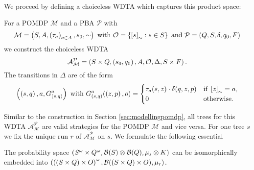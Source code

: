 We proceed by defining a choiceless \ac{WDTA} which captures this product
space:
\begin{definition}
  For a \ac{POMDP} $\mathcal{M}$ and a \ac{PBA} $\mathcal{P}$ with
  \begin{equation*}
    \mathcal{M} = \left(S, A, \left(\tau_{a}\right)_{a\in A}, s_{0}, \sim\right)
    \text{ with }
    \mathcal{O} = \left\{\left[s\right]_{\sim}: s\in S\right\}
    \text{ and }
    \mathcal{P} = \left(Q, S, \delta, q_{0}, F\right)
  \end{equation*} 
  we construct the choiceless \ac{WDTA}
  \begin{equation*}
    \mathcal{A}_{\mathcal{M}}^{\mathcal{P}} = \left(
      S\times Q, \left(s_{0}, q_{0}\right), A, \mathcal{O}, \Delta, S\times F
    \right).
  \end{equation*}
  The transitions in $\Delta$ are of the form
  \begin{equation*}
    \left(\left(s, q\right), a, G_{\left(s,q\right)}^{a}\right)
    \text{ with }
    G_{\left(s,q\right)}^{a}(\left(z,p\right), o) = \begin{cases}
      \tau_{a}(s, z)\cdot\delta(q, z, p)&\text{if }\left[z\right]_{\sim} = o,\\
      0&\text{otherwise}.
    \end{cases}
  \end{equation*}
\end{definition}
Similar to the construction in Section \ref{sec:modellingpomdp}, all trees for
this \ac{WDTA} $\mathcal{A}_{\mathcal{M}}^{\mathcal{P}}$ are valid strategies
for the \ac{POMDP} $\mathcal{M}$ and vice versa. For one tree $s$ we fix the
unique run $r$ of $\mathcal{A}_{\mathcal{M}}^{\mathcal{P}}$ on $s$.
We formulate the following essential
\begin{lemma}
  The probability space $\left(S^{\omega}\times Q^{\omega},
  \mathcal{B}(S)\otimes\mathcal{B}(Q), \mu_{s}\otimes K\right)$ can be isomorphically
  embedded into $\left(\left(\left(S\times Q\right)\times O\right)^{\omega},
  \mathcal{B}(\left(S\times Q\right)\times O), \mu_{r}\right)$.
  \label{lem:embedmuK}
\end{lemma}
